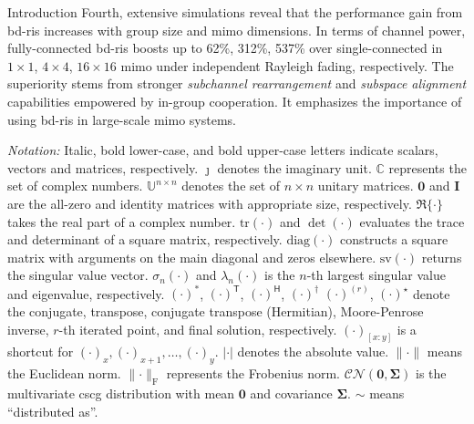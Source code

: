 \documentclass[journal]{IEEEtran}
\begin{document}
\begin{section}{Introduction}
	Fourth, extensive simulations reveal that the performance gain from \gls{bd}-\gls{ris} increases with group size and \gls{mimo} dimensions.
	In terms of channel power, fully-connected \gls{bd}-\gls{ris} boosts up to 62\%, 312\%, 537\% over single-connected in $1 \times 1$, $4 \times 4$, $16 \times 16$ \gls{mimo} under independent Rayleigh fading, respectively.
	The superiority stems from stronger \emph{subchannel rearrangement} and \emph{subspace alignment} capabilities empowered by in-group cooperation.
	It emphasizes the importance of using \gls{bd}-\gls{ris} in large-scale \gls{mimo} systems.


	\emph{Notation:}
	Italic, bold lower-case, and bold upper-case letters indicate scalars, vectors and matrices, respectively.
	$\jmath$ denotes the imaginary unit.
	$\mathbb{C}$ represents the set of complex numbers.
	$\mathbb{U}^{n \times n}$ denotes the set of $n \times n$ unitary matrices.
	$\mathbf{0}$ and $\mathbf{I}$ are the all-zero and identity matrices with appropriate size, respectively.
	$\Re\{\cdot\}$ takes the real part of a complex number.
	$\mathrm{tr}(\cdot)$ and $\det(\cdot)$ evaluates the trace and determinant of a square matrix, respectively.
	$\mathrm{diag}(\cdot)$ constructs a square matrix with arguments on the main diagonal and zeros elsewhere.
	$\mathrm{sv}(\cdot)$ returns the singular value vector.
	$\sigma_n(\cdot)$ and $\lambda_n(\cdot)$ is the $n$-th largest singular value and eigenvalue, respectively.
	$(\cdot)^*$, $(\cdot)^\mathsf{T}$, $(\cdot)^\mathsf{H}$, $(\cdot)^\dagger$ $(\cdot)^{(r)}$, $(\cdot)^{\star}$ denote the conjugate, transpose, conjugate transpose (Hermitian), Moore-Penrose inverse, $r$-th iterated point, and final solution, respectively.
	$(\cdot)_{[x:y]}$ is a shortcut for $(\cdot)_x,(\cdot)_{x+1},\ldots,(\cdot)_y$.
	$\lvert \cdot \rvert$ denotes the absolute value.
	$\lVert \cdot \rVert$ means the Euclidean norm.
	$\lVert \cdot \rVert _\mathrm{F}$ represents the Frobenius norm.
	$\mathcal{CN}(\mathbf{0}, \mathbf{\Sigma})$ is the multivariate \gls{cscg} distribution with mean $\mathbf{0}$ and covariance $\mathbf{\Sigma}$.
	$\sim$ means ``distributed as''.
\end{section}
\end{document}
